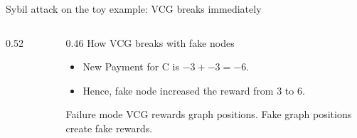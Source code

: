 \documentclass[10pt,aspectratio=169]{beamer}
\begin{document}
\begin{frame}{Sybil attack on the toy example: VCG breaks immediately}
\begin{columns}[T,totalwidth=\textwidth]
\begin{column}{0.52\textwidth}
\begin{figure}
  \end{figure}
\end{column}
\begin{column}{0.46\textwidth}
  {\large How VCG breaks with fake nodes}
\begin{itemize}
    \item New Payment for C is $-3 + -3 = -6$.
    \item Hence, fake node increased the reward from $3$ to $6$. 
\end{itemize}
\begin{alertblock}{Failure mode}
VCG rewards graph positions. Fake graph positions create fake rewards.
\end{alertblock}
\end{column}
\end{columns}
\end{frame}
\end{document}
